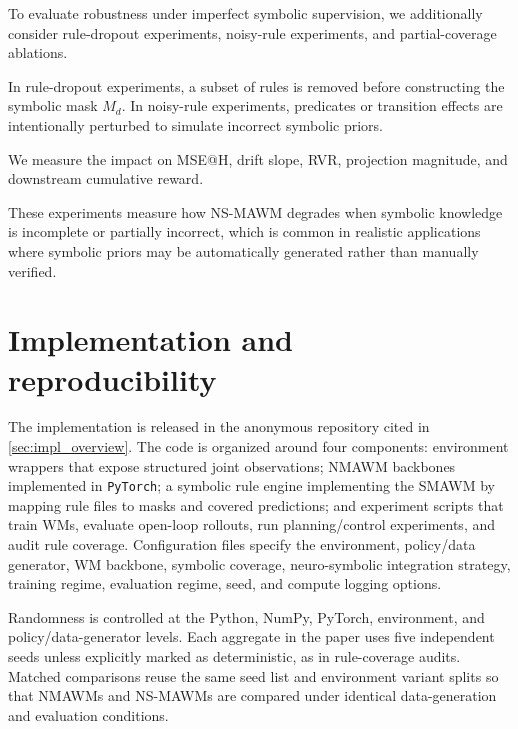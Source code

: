 \documentclass{article}
\theoremstyle{plain}
\theoremstyle{definition}
\theoremstyle{remark}
\begin{document}
To evaluate robustness under imperfect symbolic supervision, we additionally
consider rule-dropout experiments, noisy-rule experiments, and partial-coverage ablations.

In rule-dropout experiments, a subset of rules is removed before constructing
the symbolic mask $M_d$. In noisy-rule experiments, predicates or transition
effects are intentionally perturbed to simulate incorrect symbolic priors.

We measure the impact on MSE@H, drift slope, RVR, projection magnitude, and downstream cumulative reward.

These experiments measure how NS-MAWM degrades when symbolic
knowledge is incomplete or partially incorrect, which is common in realistic
applications where symbolic priors may be automatically generated rather than
manually verified.

\section{Implementation and reproducibility}
\label{app:implementation-reproducibility}

The implementation is released in the anonymous repository cited in \autoref{sec:impl_overview}. The code is organized around four components: environment wrappers that expose structured joint observations; NMAWM backbones implemented in \texttt{PyTorch}; a symbolic rule engine implementing the SMAWM by mapping rule files to masks and covered predictions; and experiment scripts that train WMs, evaluate open-loop rollouts, run planning/control experiments, and audit rule coverage. Configuration files specify the environment, policy/data generator, WM backbone, symbolic coverage, neuro-symbolic integration strategy, training regime, evaluation regime, seed, and compute logging options.

Randomness is controlled at the Python, NumPy, PyTorch, environment, and policy/data-generator levels. Each aggregate in the paper uses five independent seeds unless explicitly marked as deterministic, as in rule-coverage audits. Matched comparisons reuse the same seed list and environment variant splits so that NMAWMs and NS-MAWMs are compared under identical data-generation and evaluation conditions.
\end{document}
